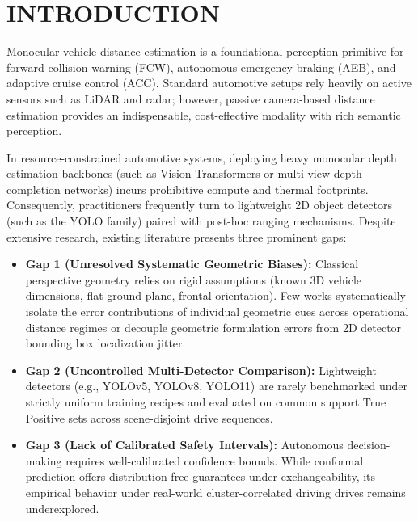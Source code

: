 \documentclass[]{spie}  %
\begin{document}

\section{INTRODUCTION}
\label{sec:intro}

Monocular vehicle distance estimation is a foundational perception primitive for forward collision warning (FCW), autonomous emergency braking (AEB), and adaptive cruise control (ACC). Standard automotive setups rely heavily on active sensors such as LiDAR and radar; however, passive camera-based distance estimation provides an indispensable, cost-effective modality with rich semantic perception.

In resource-constrained automotive systems, deploying heavy monocular depth estimation backbones (such as Vision Transformers or multi-view depth completion networks) incurs prohibitive compute and thermal footprints. Consequently, practitioners frequently turn to lightweight 2D object detectors (such as the YOLO family) paired with post-hoc ranging mechanisms. Despite extensive research, existing literature presents three prominent gaps:

\begin{itemize}
    \item \textbf{Gap 1 (Unresolved Systematic Geometric Biases):} Classical perspective geometry relies on rigid assumptions (known 3D vehicle dimensions, flat ground plane, frontal orientation). Few works systematically isolate the error contributions of individual geometric cues across operational distance regimes or decouple geometric formulation errors from 2D detector bounding box localization jitter.
    \item \textbf{Gap 2 (Uncontrolled Multi-Detector Comparison):} Lightweight detectors (e.g., YOLOv5, YOLOv8, YOLO11) are rarely benchmarked under strictly uniform training recipes and evaluated on common support True Positive sets across scene-disjoint drive sequences.
    \item \textbf{Gap 3 (Lack of Calibrated Safety Intervals):} Autonomous decision-making requires well-calibrated confidence bounds. While conformal prediction offers distribution-free guarantees under exchangeability, its empirical behavior under real-world cluster-correlated driving drives remains underexplored.
\end{itemize}
\end{document}
